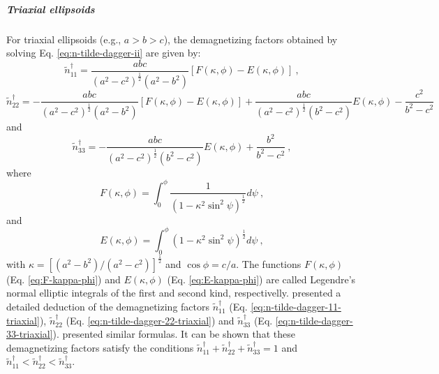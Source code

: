 \documentclass[gmd, manuscript]{copernicus}
\begin{document}
\subparagraph*{Triaxial ellipsoids}


For triaxial ellipsoids (e.g., $a > b > c$), the demagnetizing
factors obtained by solving Eq. \ref{eq:n-tilde-dagger-ii}
are given by:
\begin{equation}
\tilde{n}^{\dagger}_{11} = \frac{abc}{\left( a^{2} - c^{2} \right)^{\frac{1}{2}}
\left( a^{2} - b^{2} \right)}
\left[ F(\kappa, \phi) - E(\kappa, \phi) \right] \: ,
\label{eq:n-tilde-dagger-11-triaxial}
\end{equation}
\begin{equation}
\tilde{n}^{\dagger}_{22} =
-\frac{abc}{\left( a^{2} - c^{2} \right)^{\frac{1}{2}}
\left( a^{2} - b^{2} \right)}
\left[ F(\kappa, \phi) - E(\kappa, \phi) \right] +
\frac{abc}{\left( a^{2} - c^{2} \right)^{\frac{1}{2}}
\left( b^{2} - c^{2} \right)} E(\kappa, \phi)
- \frac{c^{2}}{b^{2} - c^{2}}
\label{eq:n-tilde-dagger-22-triaxial}
\end{equation}
and
\begin{equation}
\tilde{n}^{\dagger}_{33} =
-\frac{abc}{\left( a^{2} - c^{2} \right)^{\frac{1}{2}}
\left( b^{2} - c^{2} \right)} E(\kappa, \phi) +
\frac{b^{2}}{b^{2} - c^{2}} \: ,
\label{eq:n-tilde-dagger-33-triaxial}
\end{equation}
where
\begin{equation}
F(\kappa, \phi) =
\int^{\phi}_{0}
\frac{1}{\left( 1 - \kappa^{2} \sin^{2} \psi \right)^{\frac{1}{2}}}
d\psi \: ,
\label{eq:F-kappa-phi}
\end{equation}
and
\begin{equation}
E(\kappa, \phi) =
\int^{\phi}_{0}
\left( 1 - \kappa^{2} \sin^{2} \psi \right)^{\frac{1}{2}}
d\psi \: ,
\label{eq:E-kappa-phi}
\end{equation}
with $\kappa = \left[ \left( a^{2} - b^{2} \right) /
\left( a^{2} - c^{2} \right) \right]^{\frac{1}{2}}$ and
$\cos \phi = c/a$.
The functions $F(\kappa, \phi)$ (Eq. \ref{eq:F-kappa-phi}) and
$E(\kappa, \phi)$ (Eq. \ref{eq:E-kappa-phi}) are
called Legendre's normal elliptic integrals of the first and
second kind, respectivelly. \citet{stoner1945} presented a
detailed deduction of the demagnetizing factors $\tilde{n}^{\dagger}_{11}$
(Eq. \ref{eq:n-tilde-dagger-11-triaxial}), $\tilde{n}^{\dagger}_{22}$
(Eq. \ref{eq:n-tilde-dagger-22-triaxial}) and $\tilde{n}^{\dagger}_{33}$
(Eq. \ref{eq:n-tilde-dagger-33-triaxial}). \citet{clark1986} presented similar
formulas. It can be shown that these demagnetizing factors
satisfy the conditions
$\tilde{n}^{\dagger}_{11} + \tilde{n}^{\dagger}_{22} + \tilde{n}^{\dagger}_{33} = 1$
and
$\tilde{n}^{\dagger}_{11} < \tilde{n}^{\dagger}_{22} < \tilde{n}^{\dagger}_{33}$.
\end{document}
